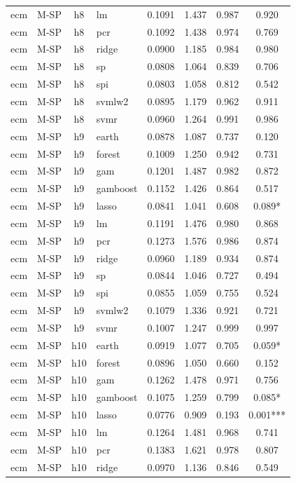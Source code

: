 \begin{ThreePartTable}
\begin{longtable}[t]{llclcccc}
ecm & M-SP & h8 & lm & 0.1091 & 1.437 & 0.987 & 0.920\\
ecm & M-SP & h8 & pcr & 0.1092 & 1.438 & 0.974 & 0.769\\
ecm & M-SP & h8 & ridge & 0.0900 & 1.185 & 0.984 & 0.980\\
ecm & M-SP & h8 & sp & 0.0808 & 1.064 & 0.839 & 0.706\\
ecm & M-SP & h8 & spi & 0.0803 & 1.058 & 0.812 & 0.542\\
ecm & M-SP & h8 & svmlw2 & 0.0895 & 1.179 & 0.962 & 0.911\\
ecm & M-SP & h8 & svmr & 0.0960 & 1.264 & 0.991 & 0.986\\
\addlinespace
ecm & M-SP & h9 & earth & 0.0878 & 1.087 & 0.737 & 0.120\\
ecm & M-SP & h9 & forest & 0.1009 & 1.250 & 0.942 & 0.731\\
ecm & M-SP & h9 & gam & 0.1201 & 1.487 & 0.982 & 0.872\\
ecm & M-SP & h9 & gamboost & 0.1152 & 1.426 & 0.864 & 0.517\\
ecm & M-SP & h9 & lasso & 0.0841 & 1.041 & 0.608 & 0.089*\\
ecm & M-SP & h9 & lm & 0.1191 & 1.476 & 0.980 & 0.868\\
ecm & M-SP & h9 & pcr & 0.1273 & 1.576 & 0.986 & 0.874\\
ecm & M-SP & h9 & ridge & 0.0960 & 1.189 & 0.934 & 0.874\\
ecm & M-SP & h9 & sp & 0.0844 & 1.046 & 0.727 & 0.494\\
ecm & M-SP & h9 & spi & 0.0855 & 1.059 & 0.755 & 0.524\\
ecm & M-SP & h9 & svmlw2 & 0.1079 & 1.336 & 0.921 & 0.721\\
ecm & M-SP & h9 & svmr & 0.1007 & 1.247 & 0.999 & 0.997\\
\addlinespace
ecm & M-SP & h10 & earth & 0.0919 & 1.077 & 0.705 & 0.059*\\
ecm & M-SP & h10 & forest & 0.0896 & 1.050 & 0.660 & 0.152\\
ecm & M-SP & h10 & gam & 0.1262 & 1.478 & 0.971 & 0.756\\
ecm & M-SP & h10 & gamboost & 0.1075 & 1.259 & 0.799 & 0.085*\\
ecm & M-SP & h10 & lasso & 0.0776 & 0.909 & 0.193 & 0.001***\\
ecm & M-SP & h10 & lm & 0.1264 & 1.481 & 0.968 & 0.741\\
ecm & M-SP & h10 & pcr & 0.1383 & 1.621 & 0.978 & 0.807\\
ecm & M-SP & h10 & ridge & 0.0970 & 1.136 & 0.846 & 0.549\\

\end{longtable}
\end{ThreePartTable}
